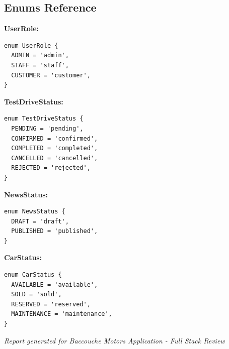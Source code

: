 \documentclass[12pt,a4paper]{article}
\begin{document}
\subsection{Enums Reference}

\bigskip
\noindent\textbf{UserRole:}
\begin{verbatim}
enum UserRole {
  ADMIN = 'admin',
  STAFF = 'staff',
  CUSTOMER = 'customer',
}
\end{verbatim}

\bigskip
\noindent\textbf{TestDriveStatus:}
\begin{verbatim}
enum TestDriveStatus {
  PENDING = 'pending',
  CONFIRMED = 'confirmed',
  COMPLETED = 'completed',
  CANCELLED = 'cancelled',
  REJECTED = 'rejected',
}
\end{verbatim}

\bigskip
\noindent\textbf{NewsStatus:}
\begin{verbatim}
enum NewsStatus {
  DRAFT = 'draft',
  PUBLISHED = 'published',
}
\end{verbatim}

\bigskip
\noindent\textbf{CarStatus:}
\begin{verbatim}
enum CarStatus {
  AVAILABLE = 'available',
  SOLD = 'sold',
  RESERVED = 'reserved',
  MAINTENANCE = 'maintenance',
}
\end{verbatim}

\bigskip
\bigskip
\noindent\textit{Report generated for Baccouche Motors Application - Full Stack Review}
\end{document}
